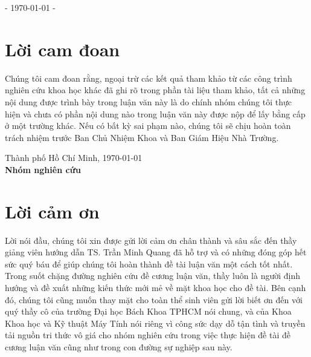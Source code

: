 \documentclass[
11pt, %
english,%
singlespacing, %
parskip, %
headsepline, %
]{MastersDoctoralThesis} %
\begin{document}
\begin{titlepage}
\begin{center}
\vfill

 
\vfill

- { \large \today} -%
 
\vfill
\end{center}
\end{titlepage}

\chapter{Lời cam đoan}
Chúng tôi cam đoan rằng, ngoại trừ các kết quả tham khảo từ các công trình nghiên cứu khoa học khác đã ghi rõ trong phần tài liệu tham khảo, tất cả những nội dung được trình bày trong luận văn này là do chính nhóm chúng tôi thực hiện và chưa có phần nội dung nào trong luận văn này được nộp để lấy bằng cấp ở một trường khác. Nếu có bất kỳ sai phạm nào, chúng tôi sẽ chịu hoàn toàn trách nhiệm trước Ban Chủ Nhiệm Khoa và Ban Giám Hiệu Nhà Trường.\\[1cm]

\begin{minipage}[t]{0.4\textwidth}
\hspace*{1cm}
\end{minipage}
\begin{minipage}[t]{0.6\textwidth}
\begin{center}
Thành phố Hồ Chí Minh, \today\\
\textbf{Nhóm nghiên cứu}
\end{center}
\end{minipage}

\chapter{Lời cảm ơn}
Lời nói đầu, chúng tôi xin được gửi lời cảm ơn chân thành và sâu sắc đến thầy giảng viên hướng dẫn TS. Trần Minh Quang đã hỗ trợ và có những đóng góp hết sức quý báu để giúp chúng tôi hoàn thành đề tài luận văn một cách tốt nhất. Trong suốt chặng đường nghiên cứu đề cương luận văn, thầy luôn là người định hướng và đề xuất những kiến thức mới mẻ về mặt khoa học cho đề tài.
Bên cạnh đó, chúng tôi cũng muốn thay mặt cho toàn thể sinh viên gửi lời biết ơn đến với quý thầy cô của trường Đại học Bách Khoa TPHCM nói chung, và của Khoa Khoa học và Kỹ thuật Máy Tính nói riêng vì công sức dạy dỗ tận tình và truyền tải nguồn tri thức vô giá cho nhóm nghiên cứu trong việc thực hiện đề tài đề cương luận văn cũng như trong con đường sự nghiệp sau này.
\end{document}
